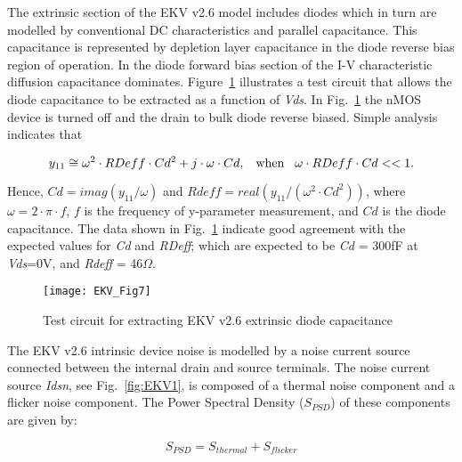 
The extrinsic section of the EKV v2.6 model includes diodes which in
turn are modelled by conventional DC characteristics and parallel
capacitance.  This capacitance is represented by depletion layer
capacitance in the diode reverse bias region of operation.  In the
diode forward bias section of the I-V characteristic diffusion
capacitance dominates. Figure~\ref{fig:EKV7} illustrates a test
circuit that allows the diode capacitance to be extracted as a
function of \textit{Vds}. In Fig.~\ref{fig:EKV7} the nMOS device is
turned off and the drain to bulk diode reverse biased. Simple analysis
indicates that

\hspace{20mm}     \begin{equation} 
			y_{11} \cong \omega^{2} \cdot RDeff \cdot Cd^{2} + j \cdot \omega \cdot Cd, \hspace{3mm} \textrm{when} \hspace{3mm} \omega \cdot RDeff \cdot Cd << 1.
                  \end{equation}  

Hence, $ Cd = imag( y_{11}/ \omega)$ and $Rdeff = real( y_{11}/(
\omega^{2} \cdot Cd^{2}))$, where $\omega = 2 \cdot \pi \cdot f$, $f$ is
the frequency of y-parameter measurement, and $Cd$ is the diode
capacitance. The data shown in Fig.~\ref{fig:EKV7} indicate good
agreement with the expected values for \textit{Cd} and \textit{RDeff};
which are expected to be \textit{Cd} = 300fF at \textit{Vds}=0V, and
\textit{Rdeff} = 46$\Omega$.
 
\begin{figure}
  \centering
  \texttt{[image: EKV\_Fig7]}
  \caption{Test circuit for extracting EKV v2.6 extrinsic diode capacitance}
  \label{fig:EKV7}
\end{figure}  



The EKV v2.6 intrinsic device noise is modelled by a noise current
source connected between the internal drain and source terminals. The
noise current source \textit{Idsn}, see Fig.~\ref{fig:EKV1}, is
composed of a thermal noise component and a flicker noise
component. The Power Spectral Density ($S_{PSD}$) of these components
are given by:

\hspace{20mm}     \begin{equation} 
			S_{PSD} = S_{thermal} + S_{flicker}
                  \end{equation}  

